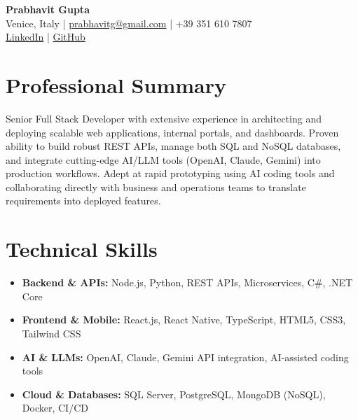 \documentclass[10pt,a4paper]{article}
\begin{document}
\begin{center}
    {\LARGE \textbf{Prabhavit Gupta}} \\
    \vspace{2mm}
    Venice, Italy | \href{mailto:prabhavitg@gmail.com}{prabhavitg@gmail.com} | +39 351 610 7807 \\
    \href{https://www.linkedin.com/in/prabhavit/}{LinkedIn} | \href{https://github.com/prab-gupta}{GitHub}
\end{center}

\vspace{4mm}
\section*{Professional Summary}
Senior Full Stack Developer with extensive experience in architecting and deploying scalable web applications, internal portals, and dashboards. Proven ability to build robust REST APIs, manage both SQL and NoSQL databases, and integrate cutting-edge AI/LLM tools (OpenAI, Claude, Gemini) into production workflows. Adept at rapid prototyping using AI coding tools and collaborating directly with business and operations teams to translate requirements into deployed features.

\section*{Technical Skills}
\begin{itemize}
    \item \textbf{Backend \& APIs:} Node.js, Python, REST APIs, Microservices, C\#, .NET Core
    \item \textbf{Frontend \& Mobile:} React.js, React Native, TypeScript, HTML5, CSS3, Tailwind CSS
    \item \textbf{AI \& LLMs:} OpenAI, Claude, Gemini API integration, AI-assisted coding tools
    \item \textbf{Cloud \& Databases:} SQL Server, PostgreSQL, MongoDB (NoSQL), Docker, CI/CD
\end{itemize}
\end{document}
